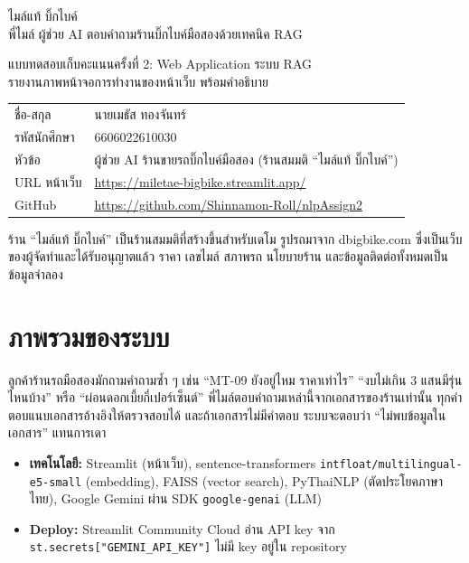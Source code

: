 \documentclass[11pt,a4paper]{article}
\newcommand{\studentname}{นายเมธัส ทองจันทร์}
\newcommand{\studentid}{6606022610030}
\newcommand{\appurl}{\url{https://miletae-bigbike.streamlit.app/}}
\newcommand{\repourl}{https://github.com/Shinnamon-Roll/nlpAssign2}
\begin{document}
\begin{titlepage}
\begin{tcolorbox}[colback=ink,colframe=ink,arc=4pt,left=16pt,right=16pt,top=14pt,bottom=14pt]
{\color{white}\headfont\fontsize{30}{36}\selectfont ไมล์แท้ บิ๊กไบค์}\\[4pt]
{\color{white!85!ink}\large พี่ไมล์ ผู้ช่วย AI ตอบคำถามร้านบิ๊กไบค์มือสองด้วยเทคนิค RAG}
\end{tcolorbox}
\vspace{1.5cm}
{\headfont\Large แบบทดสอบเก็บคะแนนครั้งที่ 2: Web Application ระบบ RAG}\\[8pt]
รายงานภาพหน้าจอการทำงานของหน้าเว็บ พร้อมคำอธิบาย

\vspace{1.5cm}
\renewcommand{\arraystretch}{1.6}
\begin{tabularx}{\textwidth}{@{}lX@{}}
ชื่อ-สกุล & \studentname \\
รหัสนักศึกษา & \studentid \\
หัวข้อ & ผู้ช่วย AI ร้านขายรถบิ๊กไบค์มือสอง (ร้านสมมติ ``ไมล์แท้ บิ๊กไบค์'') \\
URL หน้าเว็บ & \appurl \\
GitHub & \url{\repourl} \\
\end{tabularx}

\vfill
\begin{note}\small
ร้าน ``ไมล์แท้ บิ๊กไบค์'' เป็นร้านสมมติที่สร้างขึ้นสำหรับเดโม รูปรถมาจาก dbigbike.com ซึ่งเป็นเว็บของผู้จัดทำและได้รับอนุญาตแล้ว
ราคา เลขไมล์ สภาพรถ นโยบายร้าน และข้อมูลติดต่อทั้งหมดเป็นข้อมูลจำลอง
\end{note}
\end{titlepage}

\section{ภาพรวมของระบบ}
ลูกค้าร้านรถมือสองมักถามคำถามซ้ำ ๆ เช่น ``MT-09 ยังอยู่ไหม ราคาเท่าไร'' ``งบไม่เกิน 3 แสนมีรุ่นไหนบ้าง'' หรือ ``ผ่อนดอกเบี้ยกี่เปอร์เซ็นต์''
พี่ไมล์ตอบคำถามเหล่านี้จากเอกสารของร้านเท่านั้น ทุกคำตอบแนบเอกสารอ้างอิงให้ตรวจสอบได้
และถ้าเอกสารไม่มีคำตอบ ระบบจะตอบว่า ``ไม่พบข้อมูลในเอกสาร'' แทนการเดา

\begin{itemize}
  \item \textbf{เทคโนโลยี:} Streamlit (หน้าเว็บ), sentence-transformers \texttt{intfloat/multilingual-e5-small} (embedding),
        FAISS (vector search), PyThaiNLP (ตัดประโยคภาษาไทย), Google Gemini ผ่าน SDK \texttt{google-genai} (LLM)
  \item \textbf{Deploy:} Streamlit Community Cloud อ่าน API key จาก \texttt{st.secrets["GEMINI\_API\_KEY"]} ไม่มี key อยู่ใน repository
\end{itemize}
\end{document}
